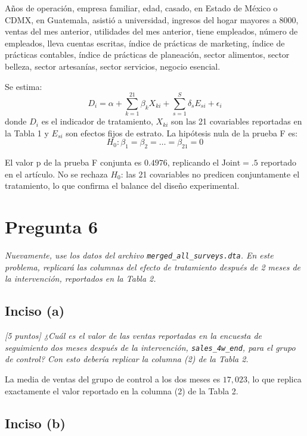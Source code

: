 \documentclass[12pt]{article}
\begin{document}
Años de operación, empresa familiar, edad, casado, en Estado de México o CDMX, en Guatemala, asistió a universidad, ingresos del hogar mayores a 8000, ventas del mes anterior, utilidades del mes anterior, tiene empleados, número de empleados, lleva cuentas escritas, índice de prácticas de marketing, índice de prácticas contables, índice de prácticas de planeación, sector alimentos, sector belleza, sector artesanías, sector servicios, negocio esencial.

Se estima:
\begin{equation}
D_i = \alpha + \sum_{k=1}^{21} \beta_k X_{ki} + \sum_{s=1}^{S} \delta_s E_{si} + \epsilon_i
\end{equation}
donde $D_i$ es el indicador de tratamiento, $X_{ki}$ son las 21 covariables reportadas en la Tabla 1 y $E_{si}$ son efectos fijos de estrato. La hipótesis nula de la prueba F es:
\[
H_0: \beta_1 = \beta_2 = \dots = \beta_{21} = 0
\]



El valor p de la prueba F conjunta es $0.4976$, replicando el $\text{Joint} = .5$ reportado en el artículo. No se rechaza $H_0$: las 21 covariables no predicen conjuntamente el tratamiento, lo que confirma el balance del diseño experimental.

\section{Pregunta 6}

\textit{Nuevamente, use los datos del archivo \texttt{merged\_all\_surveys.dta}. En este problema, replicará las columnas del efecto de tratamiento después de 2 meses de la intervención, reportados en la Tabla 2.}

\subsection*{Inciso (a)}

\textit{[5 puntos] ¿Cuál es el valor de las ventas reportadas en la encuesta de seguimiento dos meses después de la intervención, \texttt{sales\_4w\_end}, para el grupo de control? Con esto debería replicar la columna (2) de la Tabla 2.}



La media de ventas del grupo de control a los dos meses es $17{,}023$, lo que replica exactamente el valor reportado en la columna (2) de la Tabla 2.

\subsection*{Inciso (b)}
\end{document}
